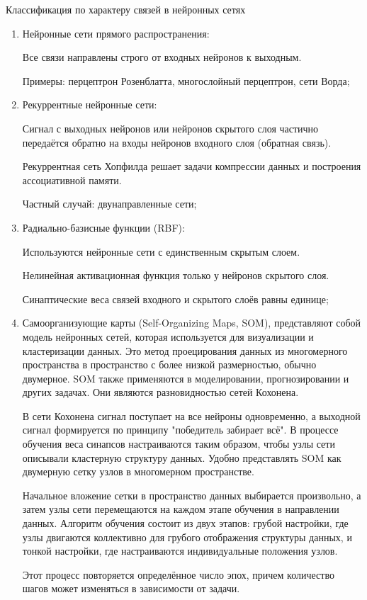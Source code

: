 Классификация по характеру связей в нейронных сетях
\begin{enumerate}
\item   Нейронные сети прямого распространения:

	Все связи направлены строго от входных нейронов к выходным.

	Примеры: перцептрон Розенблатта, многослойный перцептрон, сети Ворда;

\item Рекуррентные нейронные сети:

	Сигнал с выходных нейронов или нейронов скрытого слоя частично передаётся обратно на входы нейронов входного слоя (обратная связь).
	
	Рекуррентная сеть Хопфилда решает задачи компрессии данных и построения ассоциативной памяти.
	
	Частный случай: двунаправленные сети;
	
 \item Радиально-базисные функции (RBF):

	Используются нейронные сети с единственным скрытым слоем.
	
	Нелинейная активационная функция только у нейронов скрытого слоя.
	
	Синаптические веса связей входного и скрытого слоёв равны единице;
\item Самоорганизующие карты (Self-Organizing Maps, SOM), представляют собой модель нейронных сетей, которая используется для визуализации и кластеризации данных. Это метод проецирования данных из многомерного пространства в пространство с более низкой размерностью, обычно двумерное. SOM также применяются в моделировании, прогнозировании и других задачах. Они являются разновидностью сетей Кохонена.

В сети Кохонена сигнал поступает на все нейроны одновременно, а выходной сигнал формируется по принципу "победитель забирает всё". В процессе обучения веса синапсов настраиваются таким образом, чтобы узлы сети описывали кластерную структуру данных. Удобно представлять SOM как двумерную сетку узлов в многомерном пространстве.

Начальное вложение сетки в пространство данных выбирается произвольно, а затем узлы сети перемещаются на каждом этапе обучения в направлении данных. Алгоритм обучения состоит из двух этапов: грубой настройки, где узлы двигаются коллективно для грубого отображения структуры данных, и тонкой настройки, где настраиваются индивидуальные положения узлов.

Этот процесс повторяется определённое число эпох, причем количество шагов может изменяться в зависимости от задачи.
\end{enumerate}

